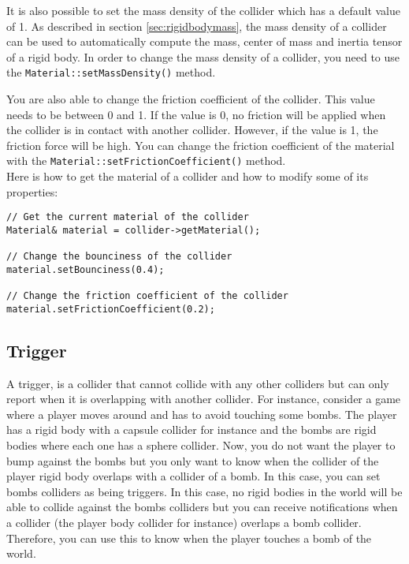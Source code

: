 \documentclass[a4paper,12pt]{article}
\begin{document}
    \begin{sloppypar}
    It is also possible to set the mass density of the collider which has a default value of 1. As described in section \ref{sec:rigidbodymass}, the
    mass density of a collider can be used to automatically compute the mass, center of mass and inertia tensor of a rigid body. In order to change the
    mass density of a collider, you need to use the \texttt{Material::setMassDensity()} method. \\
    \end{sloppypar}

    You are also able to change the friction coefficient of the collider. This value needs to be between 0 and 1. If the value is 0,
    no friction will be applied when the collider is in contact with another collider. However, if the value is 1, the friction force will be high. You can
    change the friction coefficient of the material with the \texttt{Material::\allowbreak setFrictionCoefficient()} method. \\

    Here is how to get the material of a collider and how to modify some of its properties: \\

    \begin{lstlisting}
// Get the current material of the collider
Material& material = collider->getMaterial();

// Change the bounciness of the collider
material.setBounciness(0.4);

// Change the friction coefficient of the collider
material.setFrictionCoefficient(0.2);
  \end{lstlisting}

    \subsection{Trigger}
    \label{sec:trigger}

    A trigger, is a collider that cannot collide with any other colliders but can only report when it is overlapping with another collider. For instance,
    consider a game where a player moves around and has to avoid touching some bombs. The player has a rigid body with a capsule collider for instance and
    the bombs are rigid bodies where each one has a sphere collider. Now, you do not want the player to bump against the bombs but you only want to know
    when the collider of the player rigid body overlaps with a collider of a bomb. In this case, you can set bombs colliders as being triggers. In this
    case, no rigid bodies in the world will be able to collide against the bombs colliders but you can receive notifications when a collider (the player
    body collider for instance) overlaps a bomb collider. Therefore, you can use this to know when the player touches a bomb of the world. \\
    
\end{document}
